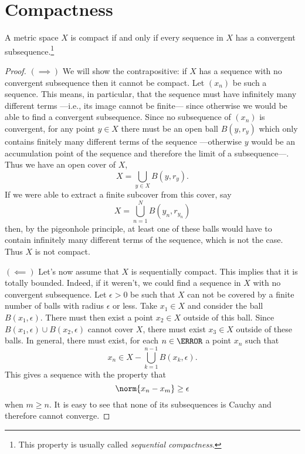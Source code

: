 \documentclass[12pt,oneside]{book}
\begin{document}
\section{Compactness}
\begin{theorem}
	A metric space \( X \) is compact if and only if every sequence in \( X \) has a
	convergent subsequence.\footnote{This property is usually called \emph{sequential
	compactness}.}
\end{theorem}
\begin{proof}
	\( (\implies) \) We will show the contrapositive: if \( X \) has a sequence with no
	convergent subsequence then it cannot be compact. Let \( (x_n) \) be such a sequence.
	This means, in particular, that the sequence must have infinitely many different terms
	---i.e., its image cannot be finite--- since otherwise we would be able to find a convergent
	subsequence.	Since no subsequence of	\( (x_n) \) is convergent, for any point \( y \in
	X \) there must be an open ball \( B(y, r_y) \) which only contains finitely many
	different terms of the sequence ---otherwise \( y \) would be an accumulation point of
	the sequence and therefore the  limit of a subsequence---. Thus we have an open cover of
	\( X \),
	\begin{equation*}
		X = \bigcup_{y \in X} B(y, r_y).
	\end{equation*}
	If we were able to extract a finite subcover from this cover, say
	\begin{equation*}
		X = \bigcup_{n = 1}^N B(y_n, r_{y_n})
	\end{equation*}
	then, by the pigeonhole principle, at least one of these balls would have to contain
	infinitely many different terms of the sequence, which is not the case. Thus \( X \) is
	not compact.

	\( (\impliedby) \) Let's now assume that \( X \) is sequentially compact. This implies
	that it is totally bounded. Indeed, if it weren't, we could find a sequence in \( X \)
	with no convergent subsequence. Let \( \epsilon > 0 \) be such that \( X \) can not be
	covered by a finite number of balls with radius \( \epsilon \) or less. Take \( x_1 \in
	X\) and consider the ball \( B(x_1, \epsilon) \). There must then exist a point \( x_2
	\in X \) outside of this ball. Since \( B(x_1, \epsilon) \cup B(x_2, \epsilon) \) cannot
	cover \( X \), there must exist \( x_3 \in X \) outside of these balls. In general,
	there must exist, for each \( n \in \N \) a point \( x_n \) such that
	\begin{equation*}
		x_n \in X - \bigcup_{k = 1}^{n-1} B(x_k, \epsilon).
	\end{equation*}
	This gives a sequence with the property that
	\begin{equation*}
		\norm{x_n - x_m} \geq \epsilon
	\end{equation*}
	when \( m \geq n \). It is easy to see that none of its subsequences is Cauchy and
	therefore cannot converge.


\end{proof}
\end{document}
